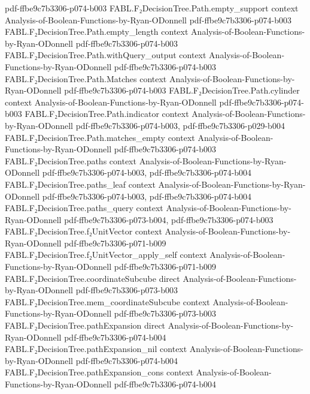 \begin{theorem}
  {pdf-ffbe9c7b3306-p074-b003}
\proofstep
  {FABL.F₂DecisionTree.Path.empty_support}
  {context}
  {Analysis-of-Boolean-Functions-by-Ryan-ODonnell}
  {pdf-ffbe9c7b3306-p074-b003}
\proofstep
  {FABL.F₂DecisionTree.Path.empty_length}
  {context}
  {Analysis-of-Boolean-Functions-by-Ryan-ODonnell}
  {pdf-ffbe9c7b3306-p074-b003}
\proofstep
  {FABL.F₂DecisionTree.Path.withQuery_output}
  {context}
  {Analysis-of-Boolean-Functions-by-Ryan-ODonnell}
  {pdf-ffbe9c7b3306-p074-b003}
\proofstep
  {FABL.F₂DecisionTree.Path.Matches}
  {context}
  {Analysis-of-Boolean-Functions-by-Ryan-ODonnell}
  {pdf-ffbe9c7b3306-p074-b003}
\proofstep
  {FABL.F₂DecisionTree.Path.cylinder}
  {context}
  {Analysis-of-Boolean-Functions-by-Ryan-ODonnell}
  {pdf-ffbe9c7b3306-p074-b003}
\proofstep
  {FABL.F₂DecisionTree.Path.indicator}
  {context}
  {Analysis-of-Boolean-Functions-by-Ryan-ODonnell}
  {pdf-ffbe9c7b3306-p074-b003,
    pdf-ffbe9c7b3306-p029-b004}
\proofstep
  {FABL.F₂DecisionTree.Path.matches_empty}
  {context}
  {Analysis-of-Boolean-Functions-by-Ryan-ODonnell}
  {pdf-ffbe9c7b3306-p074-b003}
\proofstep
  {FABL.F₂DecisionTree.paths}
  {context}
  {Analysis-of-Boolean-Functions-by-Ryan-ODonnell}
  {pdf-ffbe9c7b3306-p074-b003,
    pdf-ffbe9c7b3306-p074-b004}
\proofstep
  {FABL.F₂DecisionTree.paths_leaf}
  {context}
  {Analysis-of-Boolean-Functions-by-Ryan-ODonnell}
  {pdf-ffbe9c7b3306-p074-b003,
    pdf-ffbe9c7b3306-p074-b004}
\proofstep
  {FABL.F₂DecisionTree.paths_query}
  {context}
  {Analysis-of-Boolean-Functions-by-Ryan-ODonnell}
  {pdf-ffbe9c7b3306-p073-b004,
    pdf-ffbe9c7b3306-p074-b003}
\proofstep
  {FABL.F₂DecisionTree.f₂UnitVector}
  {context}
  {Analysis-of-Boolean-Functions-by-Ryan-ODonnell}
  {pdf-ffbe9c7b3306-p071-b009}
\proofstep
  {FABL.F₂DecisionTree.f₂UnitVector_apply_self}
  {context}
  {Analysis-of-Boolean-Functions-by-Ryan-ODonnell}
  {pdf-ffbe9c7b3306-p071-b009}
\proofstep
  {FABL.F₂DecisionTree.coordinateSubcube}
  {direct}
  {Analysis-of-Boolean-Functions-by-Ryan-ODonnell}
  {pdf-ffbe9c7b3306-p073-b003}
\proofstep
  {FABL.F₂DecisionTree.mem_coordinateSubcube}
  {context}
  {Analysis-of-Boolean-Functions-by-Ryan-ODonnell}
  {pdf-ffbe9c7b3306-p073-b003}
\proofstep
  {FABL.F₂DecisionTree.pathExpansion}
  {direct}
  {Analysis-of-Boolean-Functions-by-Ryan-ODonnell}
  {pdf-ffbe9c7b3306-p074-b004}
\proofstep
  {FABL.F₂DecisionTree.pathExpansion_nil}
  {context}
  {Analysis-of-Boolean-Functions-by-Ryan-ODonnell}
  {pdf-ffbe9c7b3306-p074-b004}
\proofstep
  {FABL.F₂DecisionTree.pathExpansion_cons}
  {context}
  {Analysis-of-Boolean-Functions-by-Ryan-ODonnell}
  {pdf-ffbe9c7b3306-p074-b004}

\end{theorem}
